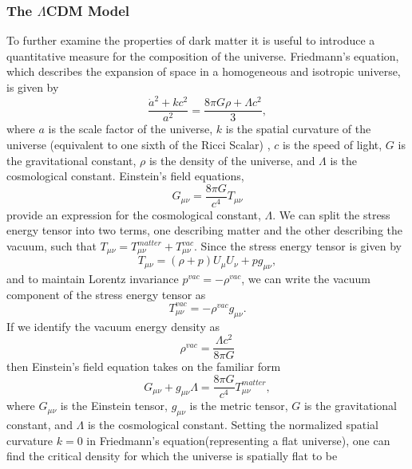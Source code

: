 \documentclass[a4paper,12pt]{article}
\begin{document}
\subsubsection{The $\Lambda$CDM Model}
To further examine the properties of dark matter it is useful to introduce a quantitative measure for the composition of the universe.  Friedmann's equation, which describes the expansion of space in a homogeneous and isotropic universe, is given by
\begin{equation}\label{Friedmann's}
\frac{\dot{a}^2 + kc^2}{a^2} = \frac{8 \pi G \rho + \Lambda c^2}{3},
\end{equation}
where $a$ is the scale factor of the universe, $k$ is the spatial curvature of the universe (equivalent to one sixth of the Ricci Scalar) , $c$ is the speed of light, $G$ is the gravitational constant, $\rho$ is the density of the universe, and $\Lambda$ is the cosmological constant. Einstein's field equations,
\begin{equation}\label{EFQ}
G_{\mu\nu} = \frac{8 \pi G}{c^4} T_{\mu\nu}
\end{equation}
provide an expression for the cosmological constant, $\Lambda$.  We can split the stress energy tensor into two terms, one describing matter and the other describing the vacuum, such that $T_{\mu\nu}=T_{\mu\nu}^{matter}+T_{\mu\nu}^{vac}$.  Since the stress energy tensor is given by
\begin{equation}\label{StressTensor}
T_{\mu\nu} = (\rho + p)U_{\mu}U_{\nu} + pg_{\mu\nu},
\end{equation}
and to maintain Lorentz invariance $p^{vac} = -\rho^{vac}$, we can write the vacuum component of the stress energy tensor as
\begin{equation}\label{StressTensorVac}
T_{\mu\nu}^{vac}=-\rho^{vac} g_{\mu\nu}.
\end{equation}
If we identify the vacuum energy density as
\begin{equation} \label{VacEnergyDens}
\rho^{vac}=\frac{\Lambda c^2}{8\pi G}
\end{equation}
then Einstein's field equation takes on the familiar form
\begin{equation}\label{EFQ2}
G_{\mu\nu} + g_{\mu\nu}\Lambda= \frac{8 \pi G}{c^4} T_{\mu\nu}^{matter},
\end{equation}
where $G_{\mu\nu}$ is the Einstein tensor, $g_{\mu\nu}$ is the metric tensor, $G$ is the gravitational constant, and $\Lambda$ is the cosmological constant.
Setting the normalized spatial curvature $k = 0$ in Friedmann's equation(representing a flat universe), one can find the critical density for which the universe is spatially flat to be
\end{document}
